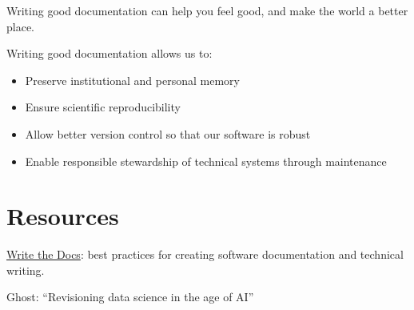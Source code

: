\documentclass[
  letterpaper,
  DIV=11,
  numbers=noendperiod]{scrartcl}
\begin{document}
Writing good documentation can help you feel good, and make the world a
better place.

Writing good documentation allows us to:

\begin{itemize}
\item
  Preserve institutional and personal memory
\item
  Ensure scientific reproducibility
\item
  Allow better version control so that our software is robust
\item
  Enable responsible stewardship of technical systems through
  maintenance
\end{itemize}

\section{Resources}\label{resources}

\href{https://www.writethedocs.org/guide/}{Write the Docs}: best
practices for creating software documentation and technical writing.

Ghost: ``Revisioning data science in the age of AI''
\end{document}
